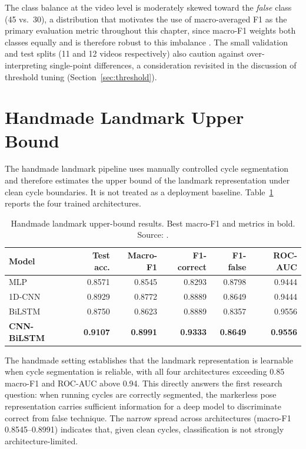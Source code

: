 The class balance at the video level is moderately skewed
toward the \emph{false} class (45 vs.\ 30), a distribution that motivates the
use of macro-averaged F1 as the primary evaluation metric throughout this
chapter, since macro-F1 weights both classes equally and is therefore
robust to this imbalance \cite{sokolova2009metrics}. The small validation and test
splits (11 and 12 videos respectively) also caution against over-interpreting
single-point differences, a consideration revisited in the discussion of
threshold tuning (Section~\ref{sec:threshold}).

\section{Handmade Landmark Upper Bound}
\label{sec:handmade}

The handmade landmark pipeline uses manually controlled cycle segmentation and
therefore estimates the upper bound of the landmark representation under clean
cycle boundaries. It is not treated as a deployment baseline. Table~\ref{tab:handmade}
reports the four trained architectures.

\begin{table}[htbp]
\centering
\caption[Handmade landmark upper-bound results. Best macro-F1 and metrics in bold. Source: \protect{}.]{Handmade landmark upper-bound results. Best macro-F1 and metrics in bold. Source: .}
\label{tab:handmade}
\tablefont
\begin{tabularx}{\textwidth}{X r r r r r}
\toprule
\textbf{Model} & \textbf{Test acc.} & \textbf{Macro-F1} & \textbf{F1-correct} & \textbf{F1-false} & \textbf{ROC-AUC} \\
\midrule
MLP        & 0.8571 & 0.8545 & 0.8293 & 0.8798 & 0.9444 \\
1D-CNN     & 0.8929 & 0.8772 & 0.8889 & 0.8649 & 0.9444 \\
BiLSTM     & 0.8750 & 0.8623 & 0.8889 & 0.8357 & 0.9556 \\
\textbf{CNN-BiLSTM} & \textbf{0.9107} & \textbf{0.8991} & \textbf{0.9333} & \textbf{0.8649} & \textbf{0.9556} \\
\bottomrule
\end{tabularx}
\end{table}

The handmade setting establishes that the landmark representation is
learnable when cycle segmentation is reliable, with all four architectures
exceeding 0.85 macro-F1 and ROC-AUC above 0.94. This directly answers the first research
question: when running cycles are correctly segmented, the markerless pose
representation carries sufficient information for a deep model to discriminate
correct from false technique. The narrow spread across
architectures (macro-F1 0.8545--0.8991) indicates that, given clean cycles,
classification is not strongly architecture-limited.

